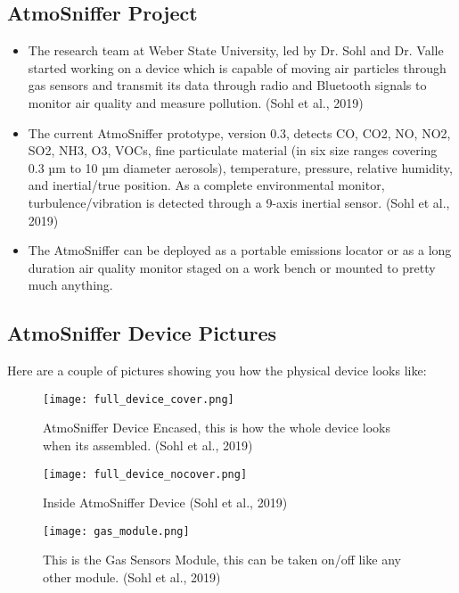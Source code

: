 \subsection{AtmoSniffer Project}
\begin{itemize}
\item The research team at Weber State University, led by Dr. Sohl and Dr. Valle started working on a device which is capable of moving air particles through gas sensors and transmit its data through radio and Bluetooth signals to monitor air quality and measure pollution. (Sohl et al., 2019) \cite{weber}

\item The current AtmoSniffer prototype, version 0.3, detects CO, CO2, NO, NO2, SO2, NH3, O3, VOCs, fine particulate material (in six size ranges covering 0.3 µm to 10 µm diameter aerosols), temperature, pressure, relative humidity, and inertial/true position. As a complete environmental monitor, turbulence/vibration is detected through a 9-axis inertial sensor. (Sohl et al., 2019)

\item The AtmoSniffer can be deployed as a portable emissions locator or as a long duration air quality monitor staged on a work bench or mounted to pretty much anything.
\end{itemize}

\subsection{AtmoSniffer Device Pictures}
Here are a couple of pictures showing you how the physical device looks like:

\begin{figure}[h]
\centering
\texttt{[image: full\_device\_cover.png]}
 \caption{AtmoSniffer Device Encased, this is how the whole device looks when its assembled. (Sohl et al., 2019)}
 \label{fig:encased_device}
\end{figure}

\begin{figure}[h]
\centering
\texttt{[image: full\_device\_nocover.png]}
 \caption{Inside AtmoSniffer Device (Sohl et al., 2019)}
 \label{fig:inside_device}
\end{figure}

\begin{figure}[h]
\centering
\texttt{[image: gas\_module.png]}
 \caption{This is the Gas Sensors Module, this can be taken on/off like any other module. (Sohl et al., 2019)}
 \label{fig:gas_sensors}
\end{figure}

